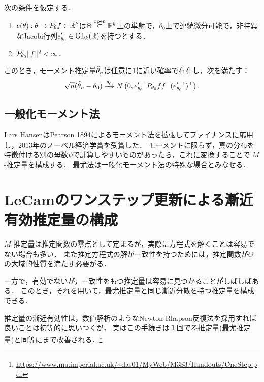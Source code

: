 \documentclass[uplatex,dvipdfmx]{jsreport}
\begin{document}
\begin{theorem}
    次の条件を仮定する．
    \begin{enumerate}[({M}1)]
        \item $e(\theta):\theta\mapsto P_\theta f\in\mathbb{R}^k$は$\Theta\overset{\mathrm{open}}{\subset}\mathbb{R}^k$上の単射で，$\theta_0$上で連続微分可能で，非特異なJacobi行列$e'_{\theta_0}\in\mathrm{GL}_k(\mathbb{R})$を持つとする．
        \item $P_{\theta_0}\|f\|^2<\infty$．
    \end{enumerate}
    このとき，モーメント推定量$\widehat{\theta}_n$は任意に$1$に近い確率で存在し，次を満たす：
    \[\sqrt{n}(\widehat{\theta}_n-\theta_0)\xrightarrow{\theta_0}N\left(0,e'^{-1}_{\theta_0}P_{\theta_0}ff^\top(e'^{-1}_{\theta_0})^\top\right).\]
\end{theorem}

\subsection{一般化モーメント法}

\begin{tcolorbox}[colframe=ForestGreen, colback=ForestGreen!10!white,breakable,colbacktitle=ForestGreen!40!white,coltitle=black,fonttitle=\bfseries\sffamily,
title=]
    Lars HansenはPearson 1894によるモーメント法を拡張してファイナンスに応用し，2013年のノーベル経済学賞を受賞した．
    モーメントに限らず，真の分布を特徴付ける別の母数$\psi$で計算しやすいものがあったら，これに変換することで
    $M$-推定量を構成する．
    最尤法は一般化モーメント法の特殊な場合とみなせる．
\end{tcolorbox}

\section{LeCamのワンステップ更新による漸近有効推定量の構成}

\begin{tcolorbox}[colframe=ForestGreen, colback=ForestGreen!10!white,breakable,colbacktitle=ForestGreen!40!white,coltitle=black,fonttitle=\bfseries\sffamily,
title=一致推定量さえ見つかれば，漸近分散は逆Fisher情報行列まで改善できる標準的算譜がある]
    $M$-推定量は推定関数の零点として定まるが，実際に方程式を解くことは容易でない場合も多い．
    また推定方程式の解が一致性を持つためには，推定関数が$\Theta$の大域的性質を満たす必要がる．

    一方で，有効でないが，一致性をもつ推定量は容易に見つかることがしばしばある．
    このとき，それを用いて，最尤推定量と同じ漸近分散を持つ推定量を構成できる．

    推定量の漸近有効性は，数値解析のようなNewton-Rhapson反復法を採用すれば良いことは初等的に思いつくが，
    実はこの手続きは１回で$Z$-推定量(最尤推定量)と同等にまで改善される．\footnote{\url{https://www.ma.imperial.ac.uk/~das01/MyWeb/M3S3/Handouts/OneStep.pdf}}
\end{tcolorbox}
\end{document}
